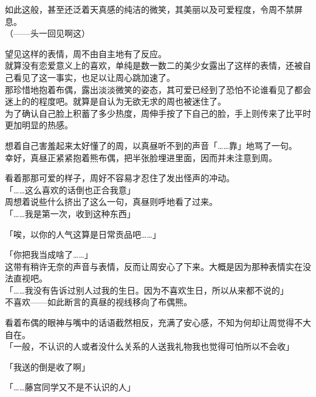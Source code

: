 如此这般，甚至还泛着天真感的纯洁的微笑，其美丽以及可爱程度，令周不禁屏息。\\

（——头一回见啊这）

望见这样的表情，周不由自主地有了反应。\\

就算没有恋爱意义上的喜欢，单纯是数一数二的美少女露出了这样的表情，还被自己看见了这一事实，也足以让周心跳加速了。\\

那珍惜地抱着布偶，露出淡淡微笑的姿态，其可爱已经到了恐怕不论谁看见了都会迷上的的程度吧。就算是自认为无欲无求的周也被迷住了。\\

为了确认自己脸上积蓄了多少热度，周伸手按了下自己的脸，手上则传来了比平时更加明显的热感。

想着自己害羞起来太好懂了的周，以真昼听不到的声音「……靠」地骂了一句。\\

幸好，真昼正紧紧抱着熊布偶，把半张脸埋进里面，因而并未注意到周。

看着那那可爱的样子，周好不容易才忍住了发出怪声的冲动。\\

「……这么喜欢的话倒也正合我意」\\

周想着说些什么挤出了这么一句，真昼则呼地看了过来。\\

「……我是第一次，收到这种东西」

「唉，以你的人气这算是日常贡品吧……」

「你把我当成啥了……」\\

这带有稍许无奈的声音与表情，反而让周安心了下来。大概是因为那种表情实在没法直视吧。\\

「……我没有告诉过别人过我的生日。因为不喜欢生日，所以从来都不说的」\\

不喜欢——如此断言的真昼的视线移向了布偶熊。

看着布偶的眼神与嘴中的话语截然相反，充满了安心感，不知为何却让周觉得不大自在。\\

「一般，不认识的人或者没什么关系的人送我礼物我也觉得可怕所以不会收」

「我送的倒是收了啊」

「……藤宫同学又不是不认识的人」\\

